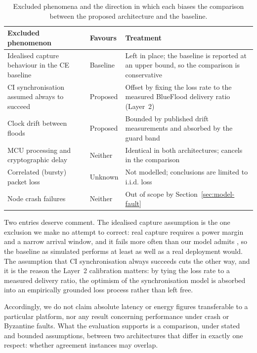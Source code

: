 \documentclass[journal]{IEEEtran}
\newcommand{\CI}{CI}                      %
\newcommand{\CE}{CE}                      %
\begin{document}
\begin{table}[!t]
\caption{Excluded phenomena and the direction in which each biases the
comparison between the proposed architecture and the baseline.}
\label{tab:bias}
\centering
\begin{tabular}{@{}p{}p{}p{}@{}}
\toprule
\textbf{Excluded phenomenon} & \textbf{Favours} & \textbf{Treatment} \\
\midrule
Idealised capture behaviour in the \CE{} baseline &
Baseline &
Left in place; the baseline is reported at an upper bound, so the
comparison is conservative \\
\addlinespace
\CI{} synchronisation assumed always to succeed &
Proposed &
Offset by fixing the loss rate to the measured BlueFlood delivery ratio
(Layer~2) \\
\addlinespace
Clock drift between floods &
Proposed &
Bounded by published drift measurements and absorbed by the guard band
\cite{baddeley23understanding} \\
\addlinespace
MCU processing and cryptographic delay &
Neither &
Identical in both architectures; cancels in the comparison \\
\addlinespace
Correlated (bursty) packet loss &
Unknown &
Not modelled; conclusions are limited to i.i.d. loss \\
\addlinespace
Node crash failures &
Neither &
Out of scope by Section~\ref{sec:model-fault} \\
\bottomrule
\end{tabular}
\end{table}

Two entries deserve comment. The idealised capture assumption is the one
exclusion we make no attempt to correct: real capture requires a power
margin and a narrow arrival window, and it fails more often than our model
admits \cite{wilhelm14reception}, so the baseline as simulated performs at
least as well as a real deployment would. The assumption that \CI{}
synchronisation always succeeds cuts the other way, and it is the reason
the Layer~2 calibration matters: by tying the loss rate to a measured
delivery ratio, the optimism of the synchronisation model is absorbed
into an empirically grounded loss process rather than left free.

Accordingly, we do not claim absolute latency or energy figures
transferable to a particular platform, nor any result concerning
performance under crash or Byzantine faults. What the evaluation supports
is a comparison, under stated and bounded assumptions, between two
architectures that differ in exactly one respect: whether agreement
instances may overlap.
\end{document}
